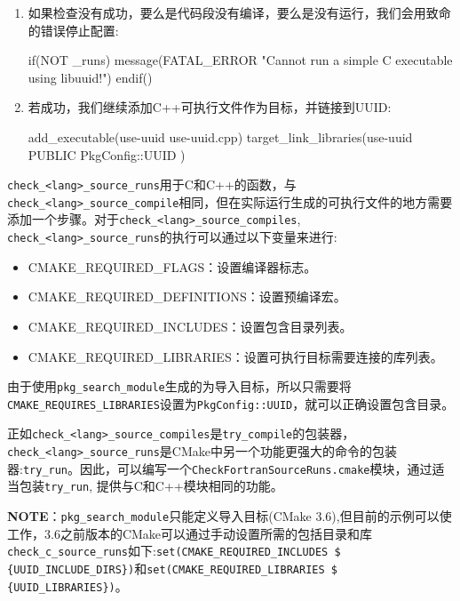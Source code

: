 \begin{enumerate}
\item 如果检查没有成功，要么是代码段没有编译，要么是没有运行，我们会用致命的错误停止配置:

\begin{codebox}[cmake]
if(NOT _runs)
    message(FATAL_ERROR "Cannot run a simple C executable using libuuid!")
endif()
\end{codebox}

\item 若成功，我们继续添加C++可执行文件作为目标，并链接到UUID:

\begin{codebox}[cmake]
add_executable(use-uuid use-uuid.cpp)
target_link_libraries(use-uuid
  PUBLIC
    PkgConfig::UUID
  )
\end{codebox}

\end{enumerate}


\texttt{check\_<lang>\_source\_runs}用于C和C++的函数，与\texttt{check\_<lang>\_source\_compile}相同，但在实际运行生成的可执行文件的地方需要添加一个步骤。对于\texttt{check\_<lang>\_source\_compiles}, \texttt{check\_<lang>\_source\_runs}的执行可以通过以下变量来进行:

\begin{itemize}
\item CMAKE\_REQUIRED\_FLAGS：设置编译器标志。

\item CMAKE\_REQUIRED\_DEFINITIONS：设置预编译宏。

\item CMAKE\_REQUIRED\_INCLUDES：设置包含目录列表。

\item CMAKE\_REQUIRED\_LIBRARIES：设置可执行目标需要连接的库列表。

\end{itemize}

由于使用\texttt{pkg\_search\_module}生成的为导入目标，所以只需要将\texttt{CMAKE\_REQUIRES\_LIBRARIES}设置为\texttt{PkgConfig::UUID}，就可以正确设置包含目录。

正如\texttt{check\_<lang>\_source\_compiles}是\texttt{try\_compile}的包装器，\texttt{check\_<lang>\_source\_runs}是CMake中另一个功能更强大的命令的包装器:\texttt{try\_run}。因此，可以编写一个\texttt{CheckFortranSourceRuns.cmake}模块，通过适当包装\texttt{try\_run}, 提供与C和C++模块相同的功能。

\begin{myInfoBox}
\textbf{NOTE}：\texttt{pkg\_search\_module}只能定义导入目标(CMake 3.6),但目前的示例可以使工作，3.6之前版本的CMake可以通过手动设置所需的包括目录和库\texttt{check\_c\_source\_runs}如下:\texttt{set(CMAKE\_REQUIRED\_INCLUDES \$ \{UUID\_INCLUDE\_DIRS\})}和\texttt{set(CMAKE\_REQUIRED\_LIBRARIES \$ \{UUID\_LIBRARIES\})}。
\end{myInfoBox}


